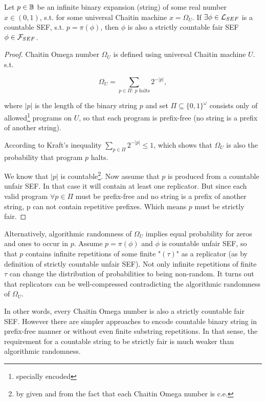 \begin{theorem}
  Let $p \in \mathbb{B}$ be an infinite binary expansion (string) of some real number $x \in (0, 1)$, s.t. for some universal Chaitin machine $x = \Omega_U$. If $\exists \phi \in \mathcal{L}_{SEF}$ is a countable SEF, s.t. $p = \pi(\phi)$, then $\phi$ is also a strictly countable fair SEF $\phi \in \mathcal{F}_{SEF}$.
\end{theorem}
\begin{proof}
  Chaitin Omega number $\Omega_U$ is defined using universal Chaitin machine $U$. s.t.

  \[ \Omega_U = \sum_{ p \in \Pi\colon\ p \text{ halts} } 2^{-|p|}, \]

  where $|p|$ is the length of the binary string $p$ and set $\Pi \subseteq \{0,1\}^\omega$ consists only of allowed\footnote{specially encoded} programs on $U$, so that each program is prefix-free (no string is a prefix of another string).

  According to Kraft's inequality $\sum_{p \in \Pi} 2^{-|p|} \leq 1$, which shows that $\Omega_U$ is also the probability that program $p$ halts.

  We know that $|p|$ is countable\footnote{by given and from the fact that each Chaitin Omega number is c.e.}. Now assume that $p$ is produced from a countable unfair SEF. In that case it will contain at least one replicator. But since each valid program $\forall p \in \Pi$ must be prefix-free and no string is a prefix of another string, p can not contain repetitive prefixes. Which means $p$ must be strictly fair.

\end{proof}

Alternatively, algorithmic randomness of $\Omega_U$ implies equal probability for zeros and ones to occur in $p$. Assume $p = \pi(\phi)$ and $\phi$ is countable unfair SEF, so that $p$ contains infinite repetitions of some finite "$(\tau)$" as a replicator (as by definition of strictly countable unfair SEF). Not only infinite repetitions of finite $\tau$ can change the distribution of probabilities to being non-random. It turns out that replicators can be well-compressed contradicting the algorithmic randomness of $\Omega_U$.

In other words, every Chaitin Omega number is also a strictly countable fair SEF. However there are simpler approaches to encode countable binary string in prefix-free manner or without even finite substring repetitions. In that sense, the requirement for a countable string to be strictly fair is much weaker than algorithmic randomness.

